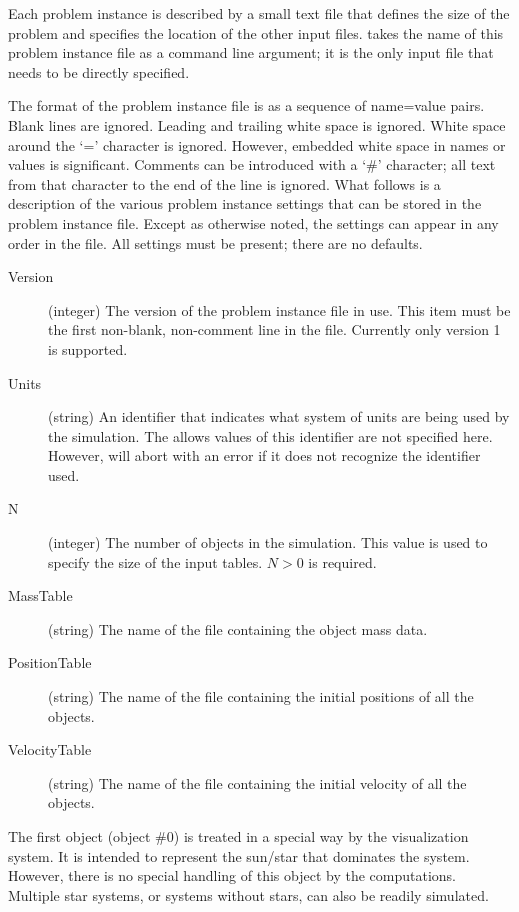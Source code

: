 Each problem instance is described by a small text file that defines the size of the problem and
specifies the location of the other input files.  takes the name of this
problem instance file as a command line argument; it is the only input file that needs to be
directly specified.

The format of the problem instance file is as a sequence of name=value pairs. Blank lines are
ignored. Leading and trailing white space is ignored. White space around the `=' character is
ignored. However, embedded white space in names or values is significant. Comments can be
introduced with a `\#' character; all text from that character to the end of the line is
ignored. What follows is a description of the various problem instance settings that can be
stored in the problem instance file. Except as otherwise noted, the settings can appear in any
order in the file. All settings must be present; there are no defaults.

\begin{description}
\item[Version] (integer) The version of the problem instance file in use. This item must be the
  first non-blank, non-comment line in the file. Currently only version 1 is supported.
\item[Units] (string) An identifier that indicates what system of units are being used by the
  simulation. The allows values of this identifier are not specified here. However,
   will abort with an error if it does not recognize the identifier used.
\item[N] (integer) The number of objects in the simulation. This value is used to specify the
  size of the input tables. $N > 0$ is required.
\item[MassTable] (string) The name of the file containing the object mass data.
\item[PositionTable] (string) The name of the file containing the initial positions of all the
  objects.
\item[VelocityTable] (string) The name of the file containing the initial velocity of all the
  objects.
\end{description}

The first object (object \#0) is treated in a special way by the visualization system. It is
intended to represent the sun/star that dominates the system. However, there is no special
handling of this object by the computations. Multiple star systems, or systems without stars,
can also be readily simulated.

